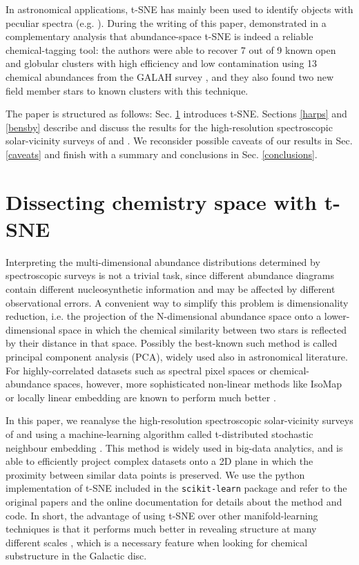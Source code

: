 \documentclass{aa}  %
\begin{document}
In astronomical applications, t-SNE has mainly been used to identify objects with peculiar spectra (e.g. \citealt{Matijevivc2017, Valentini2017, Traven2017, Reis2017}). 
During the writing of this paper, \citet{Kos2017} demonstrated in a complementary analysis that abundance-space t-SNE is indeed a reliable chemical-tagging tool: the authors were able to recover 7 out of 9 known open and globular clusters with high efficiency and low contamination using 13 chemical abundances from the GALAH survey \citep{Martell2017}, and they also found two new field member stars to known clusters with this technique. 

The paper is structured as follows: Sec. \ref{method} introduces t-SNE. Sections \ref{harps} and \ref{bensby} describe and discuss the results for the high-resolution spectroscopic solar-vicinity surveys of \citet{DelgadoMena2017} and \citet{Bensby2014}. We reconsider possible caveats of our results in Sec. \ref{caveats} and finish with a summary and conclusions in Sec. \ref{conclusions}.

\section{Dissecting chemistry space with t-SNE}\label{method}

Interpreting the multi-dimensional abundance distributions determined by spectroscopic surveys is not a trivial task, since different abundance diagrams contain different nucleosynthetic information and may be affected by different observational errors. A convenient way to simplify this problem is dimensionality reduction, i.e. the projection of the N-dimensional abundance space onto a lower-dimensional space in which the chemical similarity between two stars is reflected by their distance in that space. Possibly the best-known such method is called principal component analysis (PCA), widely used also in astronomical literature. For highly-correlated datasets such as spectral pixel spaces or chemical-abundance spaces, however, more sophisticated non-linear methods like IsoMap or locally linear embedding are known to perform much better \citep[e.g.][]{Matijevivc2012, Ivezic2013}.

In this paper, we reanalyse the high-resolution spectroscopic solar-vicinity surveys of \citet{Bensby2014} and \citet{DelgadoMena2017} using a machine-learning algorithm called t-distributed stochastic neighbour embedding \citep[t-SNE;][]{Hinton2003, vanderMaaten2008}. This method is widely used in big-data analytics, and is able to efficiently project complex datasets onto a 2D plane in which the proximity between similar data points is preserved. We use the python implementation of t-SNE included in the {\tt scikit-learn} package \citep{Pedregosa2012} and refer to the original papers and the online documentation for details about the method and code. In short, the advantage of using t-SNE over other manifold-learning techniques is that it performs much better in revealing structure at many different scales \citep{vanderMaaten2008, Matijevivc2017}, which is a necessary feature when looking for chemical substructure in the Galactic disc.
\end{document}
